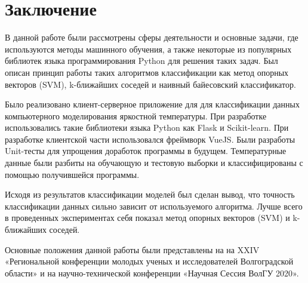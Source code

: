 \newpage
\section{Заключение}
В данной работе были рассмотрены сферы деятельности и основные задачи, где используются методы машинного обучения, а также некоторые из популярных библиотек языка программирования Python для решения таких задач. Был описан принцип работы таких алгоритмов классификации как метод опорных векторов (SVM), k-ближайших соседей и наивный байесовский классификатор.
\par
Было реализовано клиент-серверное приложение для для классификации данных компьютерного моделирования яркостной температуры. При разработке использовались такие библиотеки языка Python как Flask и Scikit-learn. При разработке клиентской части использовался фреймворк VueJS. Были разработы Unit-тесты для упрощения доработок программы в будущем. Температурные данные были разбиты на обучающую и тестовую выборки и классифицированы с помощью получившейся программы.
\par
Исходя из результатов классификации моделей был сделан вывод, что точность классификации данных сильно зависит от используемого алгоритма. Лучше всего в проведенных экспериментах себя показал метод опорных векторов (SVM) и k-ближайших соседей.
\par
Основные положения данной работы были представлены на на XXIV «Региональной конференции молодых ученых и исследователей Волгоградской области» и на научно-технической конференции «Научная Сессия ВолГУ 2020».